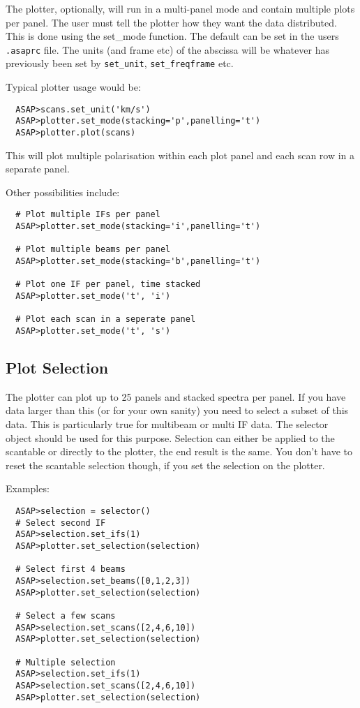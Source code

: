 \documentclass[11pt]{article}
\newcommand{\cmd}[1]{{\tt #1}}
\begin{document}
The plotter, optionally, will run in a multi-panel mode and contain
multiple plots per panel. The user must tell the plotter how they want
the data distributed. This is done using the set\_mode function. The
default can be set in the users {\tt .asaprc} file. The units (and frame
etc) of the abscissa will be whatever has previously been set by
\cmd{set\_unit}, \cmd{set\_freqframe} etc.

Typical plotter usage would be:

\begin{verbatim}
  ASAP>scans.set_unit('km/s')
  ASAP>plotter.set_mode(stacking='p',panelling='t')
  ASAP>plotter.plot(scans)
\end{verbatim}

This will plot multiple polarisation within each plot panel and each
scan row in a separate panel.

Other possibilities include:

\begin{verbatim}
  # Plot multiple IFs per panel
  ASAP>plotter.set_mode(stacking='i',panelling='t')

  # Plot multiple beams per panel
  ASAP>plotter.set_mode(stacking='b',panelling='t')

  # Plot one IF per panel, time stacked
  ASAP>plotter.set_mode('t', 'i')

  # Plot each scan in a seperate panel
  ASAP>plotter.set_mode('t', 's')

\end{verbatim}

\subsection{Plot Selection}
\label{sec:plotter_cursor}

The plotter can plot up to 25 panels and
stacked spectra per panel. If you have data larger than this (or for
your own sanity) you need to select a subset of this data. This is
particularly true for multibeam or multi IF data. The selector object
should be used for this purpose. Selection can either be applied to
the scantable or directly to the plotter, the end result is the same.
You don't have to reset the scantable selection though, if you set
the selection on the plotter.

Examples:

\begin{verbatim}
  ASAP>selection = selector()
  # Select second IF
  ASAP>selection.set_ifs(1)
  ASAP>plotter.set_selection(selection)

  # Select first 4 beams
  ASAP>selection.set_beams([0,1,2,3])
  ASAP>plotter.set_selection(selection)

  # Select a few scans
  ASAP>selection.set_scans([2,4,6,10])
  ASAP>plotter.set_selection(selection)

  # Multiple selection
  ASAP>selection.set_ifs(1)
  ASAP>selection.set_scans([2,4,6,10])
  ASAP>plotter.set_selection(selection)

\end{verbatim}
\end{document}
